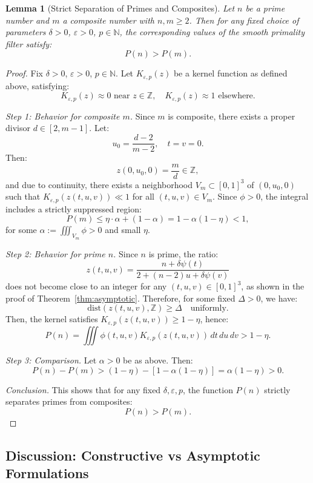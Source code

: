 \documentclass[12pt]{article}
\theoremstyle{definition}
\theoremstyle{plain}
\newtheorem{lemma}[definition]{Lemma}
\theoremstyle{remark}
\begin{document}
\begin{lemma}[Strict Separation of Primes and Composites]
Let \( n \) be a prime number and \( m \) a composite number with \( n, m \geq 2 \). Then for any fixed choice of parameters \( \delta > 0 \), \( \varepsilon > 0 \), \( p \in \mathbb{N} \), the corresponding values of the smooth primality filter satisfy:
\[
P(n) > P(m).
\]
\end{lemma}

\begin{proof}
Fix \( \delta > 0 \), \( \varepsilon > 0 \), \( p \in \mathbb{N} \). Let \( K_{\varepsilon,p}(z) \) be a kernel function as defined above, satisfying:
\[
K_{\varepsilon,p}(z) \approx 0 \text{ near } z \in \mathbb{Z}, \quad
K_{\varepsilon,p}(z) \approx 1 \text{ elsewhere}.
\]

\textit{Step 1: Behavior for composite \( m \).}  
Since \( m \) is composite, there exists a proper divisor \( d \in [2, m-1] \). Let:
\[
u_0 = \frac{d - 2}{m - 2}, \quad t = v = 0.
\]
Then:
\[
z(0, u_0, 0) = \frac{m}{d} \in \mathbb{Z},
\]
and due to continuity, there exists a neighborhood \( V_m \subset [0,1]^3 \) of \( (0,u_0,0) \) such that \( K_{\varepsilon,p}(z(t,u,v)) \ll 1 \) for all \( (t,u,v) \in V_m \). Since \( \phi > 0 \), the integral includes a strictly suppressed region:
\[
P(m) \leq \eta \cdot \alpha + (1 - \alpha) = 1 - \alpha(1 - \eta) < 1,
\]
for some \( \alpha := \iiint_{V_m} \phi > 0 \) and small \( \eta \).

\textit{Step 2: Behavior for prime \( n \).}  
Since \( n \) is prime, the ratio:
\[
z(t,u,v) = \frac{n + \delta \psi(t)}{2 + (n - 2) u + \delta \psi(v)}
\]
does not become close to an integer for any \( (t,u,v) \in [0,1]^3 \), as shown in the proof of Theorem~\ref{thm:asymptotic}. Therefore, for some fixed \( \Delta > 0 \), we have:
\[
\mathrm{dist}(z(t,u,v), \mathbb{Z}) \geq \Delta \quad \text{uniformly}.
\]
Then, the kernel satisfies \( K_{\varepsilon,p}(z(t,u,v)) \geq 1 - \eta \), hence:
\[
P(n) = \iiint \phi(t,u,v) K_{\varepsilon,p}(z(t,u,v)) \, dt\,du\,dv > 1 - \eta.
\]

\textit{Step 3: Comparison.}  
Let \( \alpha > 0 \) be as above. Then:
\[
P(n) - P(m) > (1 - \eta) - [1 - \alpha(1 - \eta)] = \alpha(1 - \eta) > 0.
\]

\textit{Conclusion.}  
This shows that for any fixed \( \delta, \varepsilon, p \), the function \( P(n) \) strictly separates primes from composites:
\[
P(n) > P(m).
\]
\end{proof}

\subsection{Discussion: Constructive vs Asymptotic Formulations}
\end{document}
